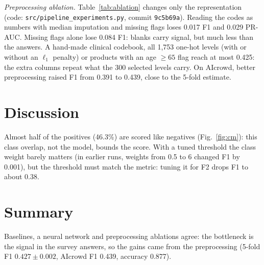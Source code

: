 \documentclass[10pt,conference,compsocconf]{IEEEtran}
\begin{document}
\emph{Preprocessing ablation.} Table~\ref{tab:ablation} changes only the
representation (code: \texttt{src/pipeline\_experiments.py}, commit
\texttt{9c5b69a}). Reading the codes as numbers with median imputation and
missing flags loses 0.017 F1 and 0.029 PR-AUC. Missing flags alone lose 0.084
F1: blanks carry signal, but much less than the answers. A hand-made clinical
codebook, all 1{,}753 one-hot levels (with or without an $\ell_1$ penalty) or
products with an age $\ge 65$ flag reach at most 0.425: the extra columns
repeat what the 300 selected levels carry. On AIcrowd, better preprocessing raised
F1 from 0.391 to 0.439, close to the 5-fold estimate.

\section{Discussion}
Almost half of the positives (46.3\%) are scored like negatives
(Fig.~\ref{fig:cm}): this class overlap, not the model, bounds the score. With a tuned threshold the class weight barely matters (in earlier runs,
weights from 0.5 to 6 changed F1 by 0.001), but the threshold must match the metric: tuning
it for F2 drops F1 to about 0.38.

\section{Summary}
Baselines, a neural network and preprocessing ablations agree: the bottleneck
is the signal in the survey answers, so the gains came from the preprocessing
(5-fold F1 $0.427\pm0.002$, AIcrowd F1 0.439, accuracy 0.877).
\end{document}
